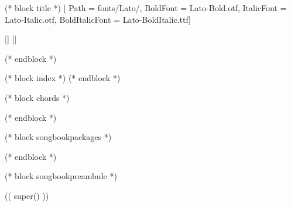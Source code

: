 (* block title *)
\setmainfont{Lato-Regular.ttf}[
Path = fonts/Lato/,
BoldFont = Lato-Bold.otf,
ItalicFont = Lato-Italic.otf,
BoldItalicFont = Lato-BoldItalic.ttf]
    \begin{titlepage}
    \begin{center}
    \raisebox{-0.5\totalheight}[\totalheight]{}
    \raisebox{-0.5\totalheight}[\totalheight]{}
    \end{center}
    \end{titlepage}
    \newpage
    \null
    \newpage
(* endblock *)

(* block index *)
(* endblock *)

(* block chords *)
    
(* endblock *)

(* block songbookpackages *)
\usepackage[
    (* for option in _bookoptions *)((option)),
    (* endfor *)
    ]{crepbook}
(* endblock *)

(* block songbookpreambule *)
\usepackage{fontspec}
\usepackage[
     a5paper %
     ,hmarginratio=1:1 %
     ,outer=1.8cm %
     ,vmarginratio=1:1 %
     ,bmargin=1.3cm %
     ,landscape
     ]{geometry}

(( super() ))

\pagestyle{empty}
\setcounter{songnum}{1}

\renewcommand{\lyricfont}{\sffamily}
\renewcommand{\printchord}[1]{\mdseries\sffamily\footnotesize#1}

